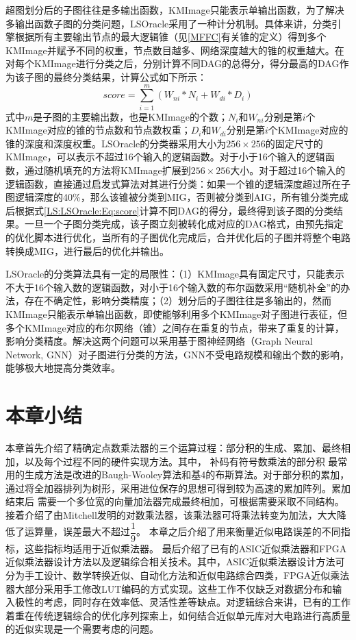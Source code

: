 超图划分后的子图往往是多输出函数，KMImage只能表示单输出函数，为了解决多输出函数子图的分类问题，LSOracle采用了一种计分机制。具体来讲，分类引擎根据所有主要输出节点的最大逻辑锥（见\ref{MFFC}有关锥的定义）得到多个KMImage并赋予不同的权重，节点数目越多、网络深度越大的锥的权重越大。在对每个KMImage进行分类之后，分别计算不同DAG的总得分，得分最高的DAG作为该子图的最终分类结果，计算公式如下所示：
\begin{equation}
\label{LS:LSOracle:Eq:score}
score = \sum_{i=1}^{m} ( W_{ni} * N_i +W_{di} *D_i )
\end{equation}
式中$m$是子图的主要输出数，也是KMImage的个数；$N_i$和$W_{ni}$分别是第$i$个KMImage对应的锥的节点数和节点数权重；$D_i$和$W_{di}$分别是第$i$个KMImage对应的锥的深度和深度权重。LSOracle的分类器采用大小为$256 \times 256$的固定尺寸的KMImage，可以表示不超过16个输入的逻辑函数。对于小于16个输入的逻辑函数，通过随机填充的方法将KMImage扩展到$256 \times 256$大小。对于超过16个输入的逻辑函数，直接通过启发式算法对其进行分类：如果一个锥的逻辑深度超过所在子图逻辑深度的40\%，那么该锥被分类到MIG，否则被分类到AIG，所有锥分类完成后根据式\eqref{LS:LSOracle:Eq:score}计算不同DAG的得分，最终得到该子图的分类结果。一旦一个子图分类完成，该子图立刻被转化成对应的DAG格式，由预先指定的优化脚本进行优化，当所有的子图优化完成后，合并优化后的子图并将整个电路转换成MIG，进行最后的优化并输出。

LSOracle的分类算法具有一定的局限性：（1）KMImage具有固定尺寸，只能表示不大于16个输入数的逻辑函数，对小于16个输入数的布尔函数采用“随机补全”的办法，存在不确定性，影响分类精度；（2）划分后的子图往往是多输出的，然而KMImage只能表示单输出函数，即使能够利用多个KMImage对子图进行表征，但多个KMImage对应的布尔网络（锥）之间存在重复的节点，带来了重复的计算，影响分类精度。解决这两个问题可以采用基于图神经网络（Graph Neural Network, GNN）对子图进行分类的方法，GNN不受电路规模和输出个数的影响，能够极大地提高分类效率。



\section{本章小结}

本章首先介绍了精确定点数乘法器的三个运算过程：部分积的生成、累加、最终相加，以及每个过程不同的硬件实现方法。其中，
补码有符号数乘法的部分积
最常用的生成方法是改进的Baugh-Wooley算法和基4的布斯算法。对于部分积的累加，通过将全加器排列为树形，采用进位保存的思想可得到较为高速的累加阵列。累加结束后
需要一个多位宽的向量加法器完成最终相加，可根据需要采取不同结构。
接着介绍了由Mitchell发明的对数乘法器，该乘法器可将乘法转变为加法，大大降低了运算量，误差最大不超过$\dfrac{1}{9}$。
本章之后介绍了用来衡量近似电路误差的不同指标，这些指标均适用于近似乘法器。
最后介绍了已有的ASIC近似乘法器和FPGA近似乘法器设计方法以及逻辑综合相关技术。其中，ASIC近似乘法器设计方法可分为手工设计、数学转换近似、自动化方法和近似电路综合四类，FPGA近似乘法器大部分采用手工修改LUT编码的方式实现。这些工作不仅缺乏对数据分布和输入极性的考虑，同时存在效率低、灵活性差等缺点。对逻辑综合来讲，已有的工作着重在传统逻辑综合的优化序列探索上，如何结合近似单元库对大电路进行高质量的近似实现是一个需要考虑的问题。